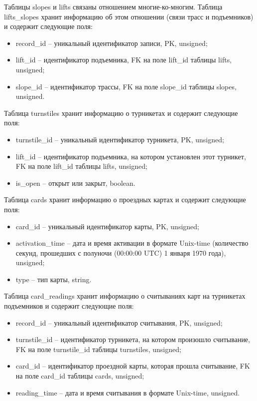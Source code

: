 Таблицы slopes и lifts связаны отношением многие-ко-многим. Таблица lifts\_slopes хранит информацию об этом отношении (связи трасс и подъемников) и содержит следующие поля:
\begin{itemize}
	\item record\_id -- уникальный идентификатор записи, PK, unsigned;
	\item lift\_id -- идентификатор подъемника, FK на поле lift\_id таблицы lifts, unsigned;
	\item slope\_id -- идентификатор трассы, FK на поле slope\_id таблицы slopes, unsigned.
\end{itemize}


Таблица turnstiles хранит информацию о турникетах и содержит следующие поля:
\begin{itemize}
	\item turnstile\_id -- уникальный идентификатор турникета, PK, unsigned;
	\item lift\_id -- идентификатор подъемника, на котором установлен этот турникет, FK на поле lift\_id таблицы lifts, unsigned;
	\item is\_open -- открыт или закрыт, boolean.
\end{itemize}


Таблица cards хранит информацию о проездных картах и содержит следующие поля:
\begin{itemize}
	\item card\_id -- уникальный идентификатор карты, PK, unsigned;
	\item activation\_time -- дата и время активации в формате Unix-time (количество секунд, прошедших с полуночи (00:00:00 UTC) 1 января 1970 года), unsigned;
	\item type -- тип карты, string.
\end{itemize}


Таблица card\_readings хранит информацию о считываниях карт на турникетах подъемников и содержит следующие поля:
\begin{itemize}
	\item record\_id -- уникальный идентификатор считывания, PK, unsigned;
	\item turnstile\_id -- идентификатор турникета, на котором произошло считывание, FK на поле turnstile\_id таблицы turnstiles, unsigned;
	\item card\_id -- идентификатор проездной карты, которая прошла считывание, FK на поле card\_id таблицы cards, unsigned;
	\item reading\_time -- дата и время считывания в формате Unix-time, unsigned.
\end{itemize}


